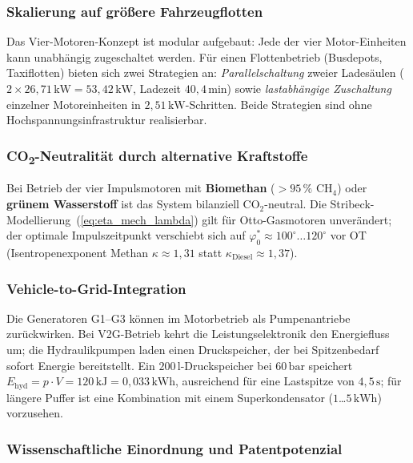 ﻿\documentclass[a4paper,12pt]{article}
\begin{document}
\subsubsection{Skalierung auf größere Fahrzeugflotten}

Das Vier-Motoren-Konzept ist modular aufgebaut: Jede der vier Motor-Einheiten
kann unabhängig zugeschaltet werden. Für einen Flottenbetrieb
(Busdepots, Taxiflotten) bieten sich zwei Strategien an:
\textit{Parallelschaltung} zweier Ladesäulen ($2 \times 26{,}71\,\text{kW}
= 53{,}42\,\text{kW}$, Ladezeit $40{,}4\,\text{min}$) sowie
\textit{lastabhängige Zuschaltung} einzelner Motoreinheiten in
$2{,}51\,\text{kW}$-Schritten. Beide Strategien sind ohne
Hochspannungsinfrastruktur realisierbar.

\subsubsection{CO\textsubscript{2}-Neutralität durch alternative Kraftstoffe}

Bei Betrieb der vier Impulsmotoren mit \textbf{Biomethan}
($> 95\,\%$ CH${}_4$) oder \textbf{grünem Wasserstoff} ist das System
bilanziell CO${}_2$-neutral. Die Stribeck-Modellierung~(\ref{eq:eta_mech_lambda})
gilt für Otto-Gasmotoren unverändert; der optimale Impulszeitpunkt verschiebt
sich auf $\varphi_0^* \approx 100^\circ\ldots120^\circ$ vor OT
(Isentropenexponent Methan $\kappa \approx 1{,}31$ statt
$\kappa_\text{Diesel} \approx 1{,}37$).

\subsubsection{Vehicle-to-Grid-Integration}

Die Generatoren G1--G3 können im Motorbetrieb als Pumpenantriebe
zurückwirken. Bei V2G-Betrieb kehrt die Leistungselektronik den Energiefluss
um; die Hydraulikpumpen laden einen Druckspeicher, der bei Spitzenbedarf
sofort Energie bereitstellt. Ein $200\,\text{l}$-Druckspeicher bei
$60\,\text{bar}$ speichert
$E_\text{hyd} = p \cdot V = 120\,\text{kJ} = 0{,}033\,\text{kWh}$,
ausreichend für eine Lastspitze von $4{,}5\,\text{s}$; für längere Puffer
ist eine Kombination mit einem Superkondensator ($1$\ldots$5\,\text{kWh}$)
vorzusehen.

\subsubsection{Wissenschaftliche Einordnung und Patentpotenzial}
\end{document}
